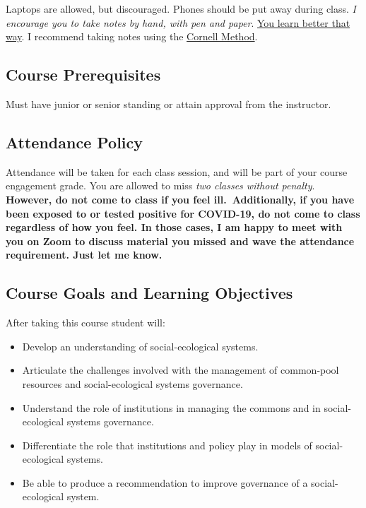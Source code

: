 \vspace{0.1in}

\noindent Laptops are allowed, but discouraged. Phones should be put
away during class. \emph{I encourage you to take notes by hand, with pen
and paper}.
\href{https://www.nytimes.com/2017/11/27/learning/should-teachers-and-professors-ban-student-use-of-laptops-in-class.html}{You
learn better that way}. I recommend taking notes using the
\href{http://www.usu.edu/arc/idea_sheets/pdf/note_taking_cornell.pdf}{Cornell
Method}.

\hypertarget{course-prerequisites}{%
\subsection{Course Prerequisites}\label{course-prerequisites}}

Must have junior or senior standing or attain approval from the
instructor.

\hypertarget{attendance-policy}{%
\subsection{Attendance Policy}\label{attendance-policy}}

Attendance will be taken for each class session, and will be part of
your course engagement grade. You are allowed to miss \emph{two classes
without penalty}. \textbf{However, do not come to class if you feel
ill.~Additionally, if you have been exposed to or tested positive for
COVID-19, do not come to class regardless of how you feel. In those
cases, I am happy to meet with you on Zoom to discuss material you
missed and wave the attendance requirement. Just let me know.}

\hypertarget{course-goals-and-learning-objectives}{%
\subsection{Course Goals and Learning
Objectives}\label{course-goals-and-learning-objectives}}

After taking this course student will:

\begin{itemize}
\item
  Develop an understanding of social-ecological systems.
\item
  Articulate the challenges involved with the management of common-pool
  resources and social-ecological systems governance.
\item
  Understand the role of institutions in managing the commons and in
  social-ecological systems governance.
\item
  Differentiate the role that institutions and policy play in models of
  social-ecological systems.
\item
  Be able to produce a recommendation to improve governance of a
  social-ecological system.
\end{itemize}

